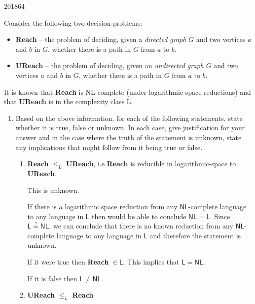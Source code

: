 \documentclass[10pt,\jkfside,a4paper]{article}
\begin{document}
\begin{examquestion}{2018}{6}{4}

Consider the following two decision problems:

\begin{itemize}

\item \textbf{Reach} -- the problem of deciding, given a \textit{directed
graph} $G$ and two vertices $a$ and $b$ in $G$, whether there is a path in
$G$ from $a$ to $b$.

\item \textbf{UReach} -- the problem of deciding, given an
\textit{undirected graph} $G$ and two vertices $a$ and $b$ in $G$, whether
there is a path in $G$ from $a$ to $b$.

\end{itemize}

It is known that \textbf{Reach} is NL-complete (under logarithmic-space
reductions) and that \textbf{UReach} is in the complexity class L\@.

\begin{enumerate}[label=(\alph*)]

\item Based on the above information, for each of the following statements,
state whether it is true, false or unknown. In each case, give justification
for your answer and in the case where the truth of the statement is
unknown, state any implications that might follow from it being true or false.

\begin{enumerate}

\item \textbf{Reach} $\le_L$ \textbf{UReach}, i.e \textbf{Reach} is
reducible in logarithmic-space to \textbf{UReach}.

This is unknown.

If there is a logarithmic space reduction from any $\mathsf{NL}$-complete
language to any language in $\mathsf L$ then would be able to conclude
$\mathsf{NL} = \mathsf L$. Since $\mathsf{L} \stackrel{?}{=} \mathsf{NL}$, we
can conclude that there is no known reduction from any
$\mathsf{NL}$-complete language to any language in $\mathsf L$ and therefore
the statement is unknown.

If it were true then \textbf{Reach} $\in \mathsf L$. This implies that
$\mathsf{L} = \mathsf{NL}$.

If it is false then $\mathsf L \ne \mathsf{NL}$.

\item \textbf{UReach} $\le_L$ \textbf{Reach}


\end{enumerate}
\end{enumerate}
\end{examquestion}
\end{document}
